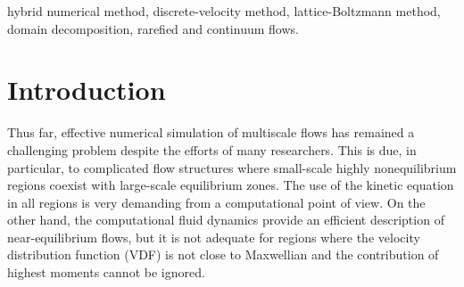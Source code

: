 \documentclass[]{elsarticle} %
\begin{document}
\begin{frontmatter}
\begin{abstract}
\end{abstract}

\begin{keyword}
hybrid numerical method,
discrete-velocity method,
lattice-Boltzmann method,
domain decomposition,
rarefied and continuum flows.
\end{keyword}

\end{frontmatter}

\linenumbers

\section{Introduction}\label{sec:intro}

Thus far, effective numerical simulation of multiscale flows has remained a challenging problem despite the efforts of many researchers.
This is due, in particular, to complicated flow structures where small-scale highly nonequilibrium regions
coexist with large-scale equilibrium zones.
The use of the kinetic equation in all regions is very demanding from a computational point of view.
On the other hand, the computational fluid dynamics provide an efficient description of near-equilibrium flows,
but it is not adequate for regions where the velocity distribution function (VDF) is not close to Maxwellian
and the contribution of highest moments cannot be ignored.
\end{document}
